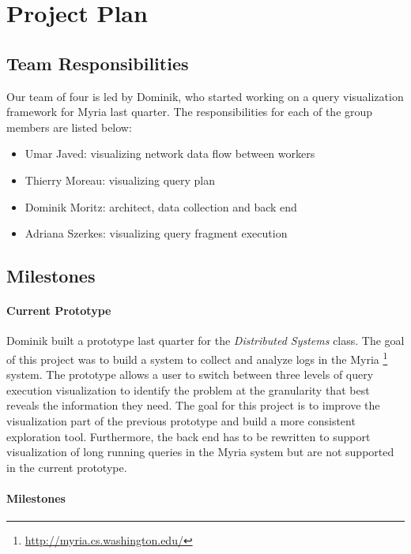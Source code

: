 \section{Project Plan}

\subsection{Team Responsibilities}

Our team of four is led by Dominik, who started working on a query visualization framework for Myria last quarter. The responsibilities for each of the group members are listed below:

\begin {itemize}
    \item Umar Javed: visualizing network data flow between workers
    \item Thierry Moreau: visualizing query plan
    \item Dominik Moritz: architect, data collection and back end
    \item Adriana Szerkes: visualizing query fragment execution
\end{itemize}

\subsection{Milestones}

\paragraph{Current Prototype}

Dominik built a prototype last quarter for the \emph{Distributed Systems} class. The goal of this project was to build a system to collect and analyze logs in the Myria \footnote{\url{http://myria.cs.washington.edu/}} system. The prototype allows a user to switch between three levels of query execution visualization to identify the problem at the granularity that best reveals the information they need. The goal for this project is to improve the visualization part of the previous prototype and build a more consistent exploration tool. Furthermore, the back end has to be rewritten to support visualization of long running queries in the Myria system but are not supported in the current prototype.

\paragraph{Milestones}


